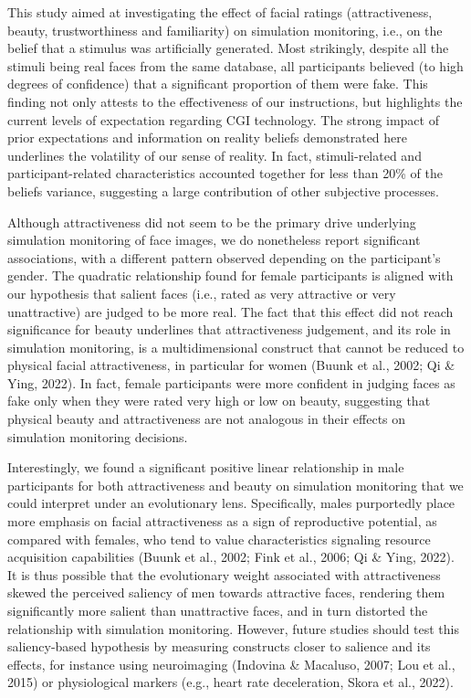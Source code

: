 \documentclass[
  man,mask,floatsintext]{apa6}
\begin{document}
This study aimed at investigating the effect of facial ratings (attractiveness, beauty, trustworthiness and familiarity) on simulation monitoring, i.e., on the belief that a stimulus was artificially generated. Most strikingly, despite all the stimuli being real faces from the same database, all participants believed (to high degrees of confidence) that a significant proportion of them were fake. This finding not only attests to the effectiveness of our instructions, but highlights the current levels of expectation regarding CGI technology. The strong impact of prior expectations and information on reality beliefs demonstrated here underlines the volatility of our sense of reality. In fact, stimuli-related and participant-related characteristics accounted together for less than 20\% of the beliefs variance, suggesting a large contribution of other subjective processes.

Although attractiveness did not seem to be the primary drive underlying simulation monitoring of face images, we do nonetheless report significant associations, with a different pattern observed depending on the participant's gender. The quadratic relationship found for female participants is aligned with our hypothesis that salient faces (i.e., rated as very attractive or very unattractive) are judged to be more real. The fact that this effect did not reach significance for beauty underlines that attractiveness judgement, and its role in simulation monitoring, is a multidimensional construct that cannot be reduced to physical facial attractiveness, in particular for women (Buunk et al., 2002; Qi \& Ying, 2022). In fact, female participants were more confident in judging faces as fake only when they were rated very high or low on beauty, suggesting that physical beauty and attractiveness are not analogous in their effects on simulation monitoring decisions.

Interestingly, we found a significant positive linear relationship in male participants for both attractiveness and beauty on simulation monitoring that we could interpret under an evolutionary lens. Specifically, males purportedly place more emphasis on facial attractiveness as a sign of reproductive potential, as compared with females, who tend to value characteristics signaling resource acquisition capabilities (Buunk et al., 2002; Fink et al., 2006; Qi \& Ying, 2022). It is thus possible that the evolutionary weight associated with attractiveness skewed the perceived saliency of men towards attractive faces, rendering them significantly more salient than unattractive faces, and in turn distorted the relationship with simulation monitoring. However, future studies should test this saliency-based hypothesis by measuring constructs closer to salience and its effects, for instance using neuroimaging (Indovina \& Macaluso, 2007; Lou et al., 2015) or physiological markers (e.g., heart rate deceleration, Skora et al., 2022).
\end{document}
